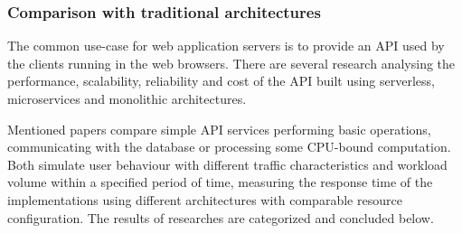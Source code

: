


\subsubsection{Comparison with traditional architectures} \label{chapter:comparison-with-traditional-architectures}

The common use-case for web application servers is to provide an API used by the clients running in the web browsers.
There are several research \cite{ServerlessComputingAnInvestigationOfDeploymentEnvironmentsForWebAPIs}\cite{MicroservicesvsServerlessAPerformanceComparisonOnCloudNativeWebApplication} analysing the performance, scalability, reliability and cost of the API built using serverless, microservices and monolithic architectures.

Mentioned papers compare simple API services performing basic operations, communicating with the database or processing some CPU-bound computation.
Both simulate user behaviour with different traffic characteristics and workload volume within a specified period of time, measuring the response time of the implementations using different architectures with comparable resource configuration. The results of researches are categorized and concluded below.




